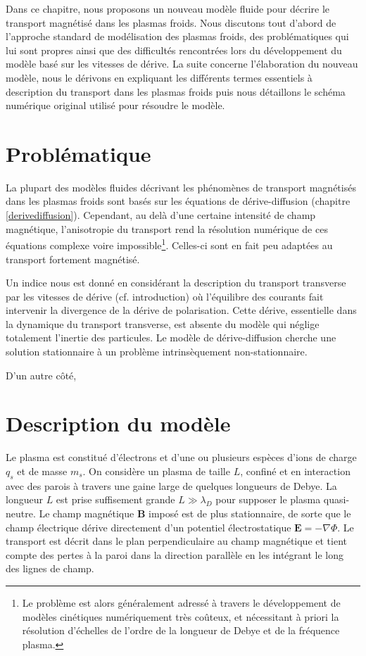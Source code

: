 Dans ce chapitre, nous proposons un nouveau modèle fluide pour décrire le
transport magnétisé dans les plasmas froids. Nous discutons tout d'abord de
l'approche standard de modélisation des plasmas froids, des problématiques qui
lui sont propres ainsi que des difficultés rencontrées lors du développement du
modèle basé sur les vitesses de dérive. La suite concerne l'élaboration du
nouveau modèle, nous le dérivons en expliquant les différents termes essentiels
à description du transport dans les plasmas froids puis nous détaillons le
schéma numérique original utilisé pour résoudre le modèle.
\section{Problématique}
La plupart des modèles fluides décrivant les phénomènes de transport magnétisés
dans les plasmas froids sont basés sur les équations de dérive-diffusion
(chapitre \ref{derivediffusion}). Cependant, au delà d'une certaine intensité de
champ magnétique, l'anisotropie du transport rend la résolution numérique de ces
équations complexe voire impossible\footnote{Le problème est alors généralement
adressé à travers le développement de modèles cinétiques numériquement très
coûteux, et nécessitant à priori la résolution d'échelles de l'ordre de la
longueur de Debye et de la fréquence plasma.}.
Celles-ci sont en fait peu adaptées au transport fortement magnétisé.


Un indice nous est donné en considérant la description du transport transverse
par les vitesses de dérive (cf.
introduction) où l'équilibre des courants fait intervenir la divergence de la
dérive de polarisation. Cette dérive, essentielle dans la dynamique du transport
transverse, est absente du modèle qui néglige totalement l'inertie des
particules. Le modèle de dérive-diffusion cherche une solution stationnaire à un
problème intrinsèquement non-stationnaire.

D'un autre côté,

\section{Description du modèle}
Le plasma est constitué d'électrons et d'une ou plusieurs espèces d'ions de
charge $q_s$ et de masse $m_s$. On considère un plasma de taille $L$, confiné et
en interaction avec des parois à travers une gaine large de quelques longueurs
de Debye. La longueur $L$ est prise suffisement grande $L\gg\lambda_D$ pour
supposer le plasma quasi-neutre. Le champ magnétique $\mathbf{B}$ imposé est de
plus stationnaire, de sorte que le champ électrique dérive directement d'un
potentiel électrostatique $\mathbf{E}=-\nabla \Phi$. Le transport est décrit
dans le plan perpendiculaire au champ magnétique et tient compte des pertes à la
paroi dans la direction parallèle en les intégrant le long des lignes de champ.

